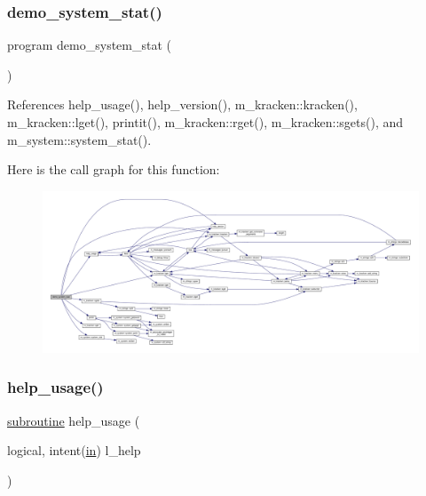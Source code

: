\subsubsection{\texorpdfstring{demo\+\_\+system\+\_\+stat()}{demo\_system\_stat()}}
{\footnotesize\ttfamily program demo\+\_\+system\+\_\+stat (\begin{DoxyParamCaption}{ }\end{DoxyParamCaption})}



References help\+\_\+usage(), help\+\_\+version(), m\+\_\+kracken\+::kracken(), m\+\_\+kracken\+::lget(), printit(), m\+\_\+kracken\+::rget(), m\+\_\+kracken\+::sgets(), and m\+\_\+system\+::system\+\_\+stat().

Here is the call graph for this function\+:
\nopagebreak
\begin{figure}[H]
\begin{center}
\leavevmode
\includegraphics[width=350pt]{__stat_8f90_adf8b7aa887ea1a5d211153cc019facf4_cgraph}
\end{center}
\end{figure}
\mbox{\label{__stat_8f90_a3e09a3b52ee8fb04eeb93fe5761626a8}} 
\subsubsection{\texorpdfstring{help\+\_\+usage()}{help\_usage()}}
{\footnotesize\ttfamily \hyperlink{M__stopwatch_83_8txt_acfbcff50169d691ff02d4a123ed70482}{subroutine} help\+\_\+usage (\begin{DoxyParamCaption}\item[{logical, intent(\hyperlink{M__journal_83_8txt_afce72651d1eed785a2132bee863b2f38}{in})}]{l\+\_\+help }\end{DoxyParamCaption})}



